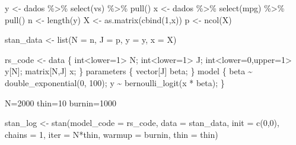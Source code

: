 \documentclass[
]{book}
\newenvironment{Shaded}{\begin{snugshade}}{\end{snugshade}}
\newcommand{\AttributeTok}[1]{\textcolor[rgb]{0.77,0.63,0.00}{#1}}
\newcommand{\DecValTok}[1]{\textcolor[rgb]{0.00,0.00,0.81}{#1}}
\newcommand{\FunctionTok}[1]{\textcolor[rgb]{0.00,0.00,0.00}{#1}}
\newcommand{\NormalTok}[1]{#1}
\newcommand{\OtherTok}[1]{\textcolor[rgb]{0.56,0.35,0.01}{#1}}
\newcommand{\SpecialCharTok}[1]{\textcolor[rgb]{0.00,0.00,0.00}{#1}}
\newcommand{\StringTok}[1]{\textcolor[rgb]{0.31,0.60,0.02}{#1}}
\begin{document}
\begin{Shaded}
\begin{Highlighting}[]
\NormalTok{y }\OtherTok{\textless{}{-}}\NormalTok{ dados }\SpecialCharTok{\%\textgreater{}\%} \FunctionTok{select}\NormalTok{(vs) }\SpecialCharTok{\%\textgreater{}\%} \FunctionTok{pull}\NormalTok{()}
\NormalTok{x }\OtherTok{\textless{}{-}}\NormalTok{ dados }\SpecialCharTok{\%\textgreater{}\%} \FunctionTok{select}\NormalTok{(mpg) }\SpecialCharTok{\%\textgreater{}\%} \FunctionTok{pull}\NormalTok{()}
\NormalTok{n }\OtherTok{\textless{}{-}} \FunctionTok{length}\NormalTok{(y)}
\NormalTok{X }\OtherTok{\textless{}{-}} \FunctionTok{as.matrix}\NormalTok{(}\FunctionTok{cbind}\NormalTok{(}\DecValTok{1}\NormalTok{,x))}
\NormalTok{p }\OtherTok{\textless{}{-}} \FunctionTok{ncol}\NormalTok{(X)}

\NormalTok{stan\_data }\OtherTok{\textless{}{-}} \FunctionTok{list}\NormalTok{(}\AttributeTok{N =}\NormalTok{ n, }\AttributeTok{J =}\NormalTok{ p, }\AttributeTok{y =}\NormalTok{ y, }\AttributeTok{x =}\NormalTok{ X)}

\NormalTok{rs\_code }\OtherTok{\textless{}{-}} \StringTok{\textquotesingle{}}
\StringTok{  data \{}
\StringTok{    int\textless{}lower=1\textgreater{} N;}
\StringTok{    int\textless{}lower=1\textgreater{} J;}
\StringTok{    int\textless{}lower=0,upper=1\textgreater{} y[N];}
\StringTok{    matrix[N,J] x;}
\StringTok{  \}}
\StringTok{  parameters \{}
\StringTok{    vector[J] beta;}
\StringTok{  \}}
\StringTok{  model \{}
\StringTok{    beta \textasciitilde{} double\_exponential(0, 100);}
\StringTok{    y \textasciitilde{} bernoulli\_logit(x * beta);}
\StringTok{  \}\textquotesingle{}}

\NormalTok{N}\OtherTok{=}\DecValTok{2000}
\NormalTok{thin}\OtherTok{=}\DecValTok{10}
\NormalTok{burnin}\OtherTok{=}\DecValTok{1000}

\NormalTok{stan\_log }\OtherTok{\textless{}{-}} \FunctionTok{stan}\NormalTok{(}\AttributeTok{model\_code =}\NormalTok{ rs\_code, }\AttributeTok{data =}\NormalTok{ stan\_data, }\AttributeTok{init =} \FunctionTok{c}\NormalTok{(}\DecValTok{0}\NormalTok{,}\DecValTok{0}\NormalTok{),}
  \AttributeTok{chains =} \DecValTok{1}\NormalTok{, }\AttributeTok{iter =}\NormalTok{ N}\SpecialCharTok{*}\NormalTok{thin, }\AttributeTok{warmup =}\NormalTok{ burnin, }\AttributeTok{thin =}\NormalTok{ thin)}
\end{Highlighting}
\end{Shaded}
\end{document}
